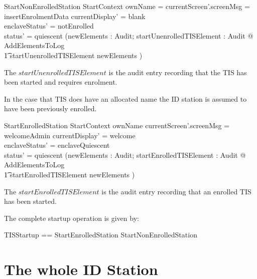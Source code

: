 \begin{schema}{StartNonEnrolledStation}
        StartContext
\where 
        ownName = \Nil
\also
        currentScreen'.screenMsg = insertEnrolmentData
\also
	currentDisplay' = blank
\\	enclaveStatus' = notEnrolled
\\      status' = quiescent
\also
        (\exists newElements : \finset Audit;
        startUnenrolledTISElement : Audit @ AddElementsToLog 
\\ \t1  \land startUnenrolledTISElement \in newElements )
\end{schema}
\begin{Zcomment}
\item
The $startUnenrolledTISElement$ is the audit entry recording that the
TIS has been started and requires enrolment. 
\end{Zcomment}

In the case that TIS does have an allocated name the ID station is
assumed to have been previously enrolled.

\begin{schema}{StartEnrolledStation}
        StartContext
\where 
        ownName \neq \Nil
\also
        currentScreen'.screenMsg = welcomeAdmin
\also
	currentDisplay' = welcome
\\	enclaveStatus' = enclaveQuiescent
\\      status' = quiescent
\also
        (\exists newElements : \finset Audit;
        startEnrolledTISElement : Audit @ AddElementsToLog 
\\ \t1  \land startEnrolledTISElement \in newElements )
\end{schema}
\begin{Zcomment}
\item
The $startEnrolledTISElement$ is the audit entry recording that an enrolled
TIS has been started. 
\end{Zcomment}

The complete startup operation is given by:

\begin{zed}
        TISStartup == StartEnrolledStation \lor
        StartNonEnrolledStation
\end{zed}








\chapter{The whole ID Station}
\label{sec:Whole}

